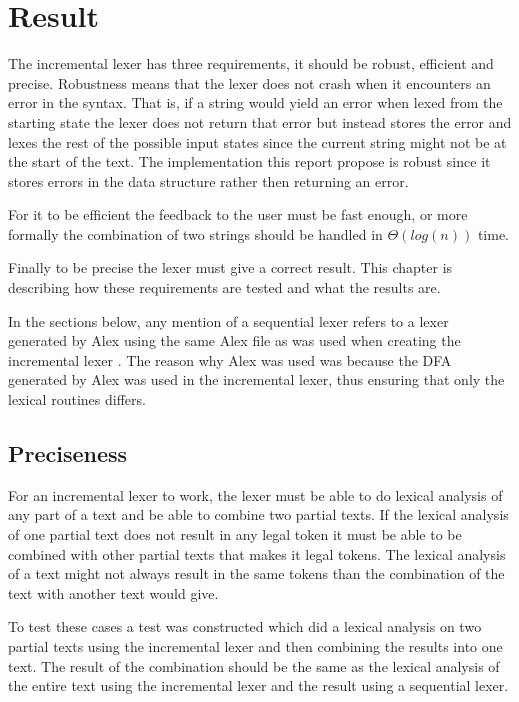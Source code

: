 \chapter{Result \label{chap:result}}
The incremental lexer has three requirements, it should be
robust, efficient and precise. Robustness means that the lexer does not crash
when it encounters an error in the syntax. That is, if a string would yield an
error when lexed from the starting state the lexer does not return that error but
instead stores the error and lexes the rest of the possible input states since
the current string might not be at the start of the text. The implementation
this report propose is robust since it stores errors in the data structure
rather then returning an error.

For it to be efficient the feedback to the user must be fast enough, or more
formally the combination of two strings should be handled in $\Theta(log(n))$ time.

Finally to be precise the lexer must give a correct result. This chapter is
describing how these requirements are tested and what the results are.

In the sections below, any mention of a sequential lexer refers to a lexer
generated by Alex using the same Alex file as was used when creating the
incremental lexer \cite{alex}. The reason why Alex was used was because the DFA
generated by Alex was used in the incremental lexer, thus ensuring that only the
lexical routines differs.

\section{Preciseness}
For an incremental lexer to work, the lexer must be able to do lexical analysis
of any part of a text and be able to combine two partial texts. If the lexical
analysis of one partial text does not result in any legal token it must be able
to be combined with other partial texts that makes it legal tokens. The lexical
analysis of a text might not always result in the same tokens than the
combination of the text with another text would give.

To test these cases a test was constructed which did a lexical analysis on two
partial texts using the incremental lexer and then combining the results into
one text. The result of the combination should be the same as the lexical
analysis of the entire text using the incremental lexer and the result using a
sequential lexer.

